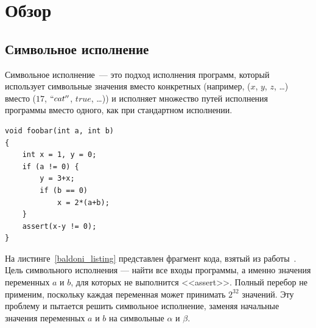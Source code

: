 \section{Обзор}\label{section:review}
\subsection{Символьное исполнение}
Символьное исполнение~--- это подход исполнения программ, который использует символьные значения вместо конкретных (например, ($x$, $y$, $z$, \dots) вместо ($17$, $``cat''$, $true$, \dots)) и исполняет множество путей исполнения программы вместо одного, как при стандартном исполнении. 

\begin{lstlisting}[caption={Программа для иллюстрации символьного исполнения},captionpos=b,label={baldoni_listing}]
void foobar(int a, int b)
{
    int x = 1, y = 0;
    if (a != 0) {
        y = 3+x;
        if (b == 0)
            x = 2*(a+b);
    }
    assert(x-y != 0);
}
\end{lstlisting}
На листинге~\ref{baldoni_listing} представлен фрагмент кода, взятый из работы~\cite{baldoni2018survey}.
Цель символьного исполнения --- найти все входы программы, а именно значения переменных $a$ и $b$, для которых не выполнится <<assert>>. Полный перебор не применим, поскольку каждая переменная может принимать $2^{32}$ значений.
Эту проблему и пытается решить символьное исполнение, заменяя начальные значения переменных $a$ и $b$ на символьные $\alpha$ и $\beta$.

